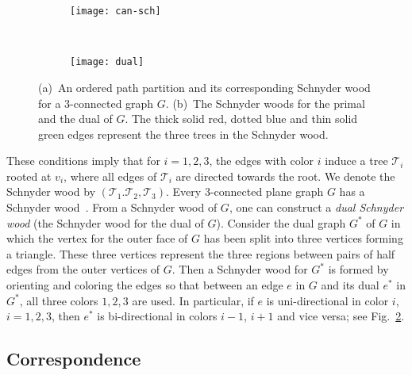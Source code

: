 \documentclass{article}
\newcommand{\TT}{{\mathcal{T}}}
\newcommand{\df}{\textit}
\begin{document}
\begin{figure}[t]
\centering
  \begin{subfigure}[t]{.45\textwidth}
    \centering
    \texttt{[image: can-sch]}
    \caption{}
    \label{fig:can-schB}
  \end{subfigure}
~
  \begin{subfigure}[t]{.45\textwidth}
    \centering
    \texttt{[image: dual]}
	\caption{}
    \label{fig:can-schA}
  \end{subfigure}
\caption{(a)~An ordered path partition
and its corresponding Schnyder wood for a $3$-connected graph $G$.
 (b)~The Schnyder woods for the primal and the dual of $G$. The thick solid red, dotted blue and thin
 solid green edges represent the three trees in the Schnyder wood.}
\label{fig:can-sch}
\end{figure}



These conditions imply that for $i=1,2,3$, the edges with color $i$
induce a tree $\TT_i$ rooted at $v_i$, where all edges of $\TT_i$ are directed towards the root.
We denote the Schnyder wood by $(\TT_1. \TT_2, \TT_3)$.
Every $3$-connected plane graph $G$ has a Schnyder wood~\cite{FZ08,BF12}.
From a Schnyder wood of
$G$, one can construct a \df{dual Schnyder wood} (the Schnyder wood for the
dual of $G$). Consider the dual graph $G^*$ of $G$ in which the vertex
for the outer face of $G$ has been split into three vertices forming a triangle. These three vertices
represent the three regions between pairs of half edges from the outer vertices of $G$. Then a Schnyder
wood for $G^*$ is formed by orienting and coloring the edges so that between an edge $e$ in $G$
and its dual $e^*$ in $G^*$, all three colors $1,2,3$ are used. In particular, if $e$ is uni-directional
in color $i$, $i=1,2,3$, then $e^*$ is bi-directional in colors $i-1$, $i+1$ and vice versa;
see Fig.~\ref{fig:can-schA}.


\subsection{Correspondence}
\label{subsect:corr}
\end{document}
